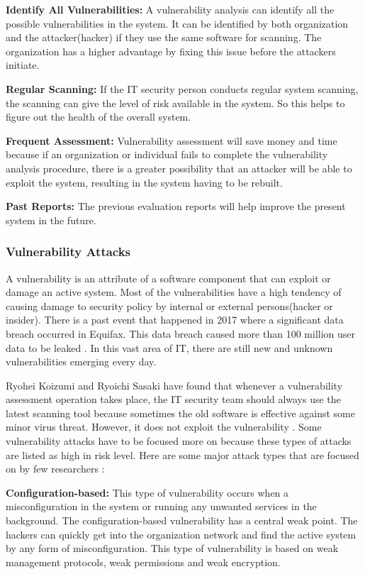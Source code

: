 \textbf{Identify All Vulnerabilities:} A vulnerability analysis can identify all the possible vulnerabilities in the system. It can be identified by both organization and the attacker(hacker) if they use the same software for scanning. The organization has a higher advantage by fixing this issue before the attackers initiate. 
	
\textbf{Regular Scanning:} If the IT security person conducts regular system scanning, the scanning can give the level of risk available in the system. So this helps to figure out the health of the overall system.
	
\textbf{Frequent Assessment: } Vulnerability assessment will save money and time because if an organization or individual fails to complete the vulnerability analysis procedure, there is a greater possibility that an attacker will be able to exploit the system, resulting in the system having to be rebuilt.
	
\textbf{Past Reports:} The previous evaluation reports will help improve the present system in the future.

\subsubsection{Vulnerability Attacks}
A vulnerability is an attribute of a software component that can exploit or damage an active system. Most of the vulnerabilities have a high tendency of causing damage to security policy by internal or external persons(hacker or insider). There is a past event that happened in 2017 where a significant data breach occurred in Equifax. This data breach caused more than 100 million user data to be leaked \cite{Gilad}. In this vast area of IT, there are still new and unknown vulnerabilities emerging every day.

Ryohei Koizumi and Ryoichi Sasaki have found that whenever a vulnerability assessment operation takes place, the IT security team should always use the latest scanning tool because sometimes the old software is effective against some minor virus threat. However, it does not exploit the vulnerability \cite{KoSa2015}. Some vulnerability attacks have to be focused more on because these types of attacks are listed as high in risk level. Here are some major attack types that are focused on by few researchers \cite{AlAl2015}:

	\textbf{Configuration-based:} This type of vulnerability occurs when a misconfiguration in the system or running any unwanted services in the background. The configuration-based vulnerability has a central weak point. The hackers can quickly get into the organization network and find the active system by any form of misconfiguration. This type of vulnerability is based on weak management protocols, weak permissions and weak encryption.
	
